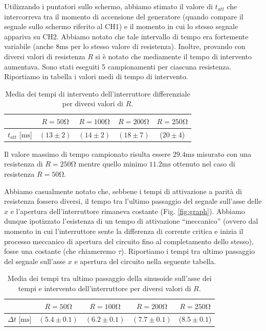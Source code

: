 Utilizzando i puntatori sullo schermo, abbiamo stimato il valore di $t_{att}$ che intercorreva tra il momento di accensione del generatore (quando compare il segnale sullo schermo riferito al CH1) e il momento in cui lo stesso segnale appariva su CH2. Abbiamo notato che tale intervallo di tempo era fortemente variabile (anche $8\si{\milli\second}$ per lo stesso valore di resistenza). Inoltre, provando con diversi valori di resistenza $R$ si è notato che mediamente il tempo di intervento aumentava. Sono stati eseguiti 5 campionamenti per ciascuna resistenza. Riportiamo in tabella i valori medi di tempo di intervento.

\begin{table}[h]
\centering
\caption{Media dei tempi di intervento dell'interruttore differenziale per diversi valori di $R$.}
{\renewcommand{\arraystretch}{1.6}%
\begin{tabular}{c|c|c|c|c}
 & $R=50 \si{\ohm}$ & $R=100 \si{\ohm}$ & $R=200 \si{\ohm}$ & $R=250 \si{\ohm}$ \\      \hline
$t_{att}$ [$\si{\milli\second}$] & $(13 \pm 2)$ & $(14 \pm 2)$ & $(18 \pm 7)$ & ($20 \pm 4$) \\\end{tabular}}
\end{table}


Il valore massimo di tempo campionato risulta essere $29.4\si{\milli\second}$ misurato con una resistenza di $R=250 \si{\ohm}$ mentre quello minimo $11.2\si{\milli\second}$ ottenuto nel caso di resistenza $R=50 \si{\ohm}$.

Abbiamo casualmente notato che, sebbene i tempi di attivazione a parità di resistenza fossero diversi, il tempo tra l'ultimo passaggio del segnale sull'asse delle $x$ e l'apertura dell'interruttore rimaneva costante (Fig. \ref{fig:graph}). Abbiamo dunque ipotizzato l'esistenza di un tempo di attivazione ``meccanico'' (ovvero dal momento in cui l'interruttore sente la differenza di corrente critica e inizia il processo meccanico di apertura del circuito fino al completamento dello stesso), fosse una costante (che chiameremo $\tau$).  Riportiamo i tempi tra ultimo passaggio del segnale sull'asse $x$ e apertura del circuito nella seguente tabella. 

\begin{table}[h]
\centering
\caption{Media dei tempi tra ultimo passaggio della sinusoide sull'asse dei tempi e intervento dell'interruttore per diversi valori di $R$.}
{\renewcommand{\arraystretch}{1.6}%
\begin{tabular}{c|c|c|c|c}
 & $R=50 \si{\ohm}$ & $R=100 \si{\ohm}$ & $R=200 \si{\ohm}$ & $R=250 \si{\ohm}$ \\      \hline
$\Delta t$ [$\si{\milli\second}$] & $(5.4 \pm 0.1)$ & $(6.2 \pm 0.1)$ & $(7.7 \pm 0.1)$ & ($8.5 \pm 0.1$) \\
\end{tabular}}
\end{table}

